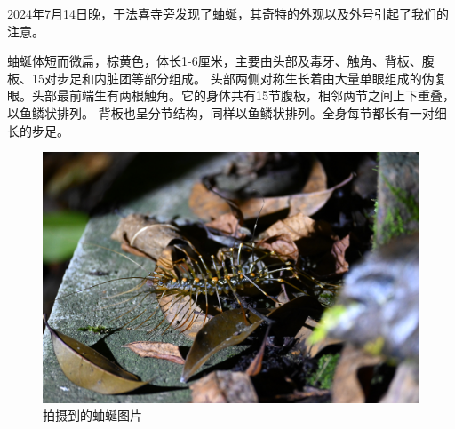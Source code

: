2024年7月14日晚，于法喜寺旁发现了蚰蜒，其奇特的外观以及外号引起了我们的注意。

蚰蜒体短而微扁，棕黄色，体长1-6厘米，主要由头部及毒牙、触角、背板、腹板、15对步足和内脏团等部分组成。
头部两侧对称生长着由大量单眼组成的伪复眼。头部最前端生有两根触角。它的身体共有15节腹板，相邻两节之间上下重叠，以鱼鳞状排列。
背板也呈分节结构，同样以鱼鳞状排列。全身每节都长有一对细长的步足。

\begin{figure}[H]
    \centering
    \includegraphics[width = .8\textwidth]{../assets/微信图片_20250226160858.jpg}
    \caption{拍摄到的蚰蜒图片}
\end{figure}